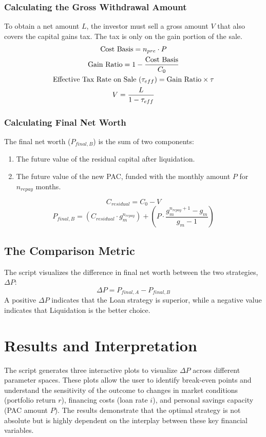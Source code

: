 \documentclass[a4paper, 11pt]{article}
\begin{document}
	\subsubsection{Calculating the Gross Withdrawal Amount}
	To obtain a net amount $L$, the investor must sell a gross amount $V$ that also covers the capital gains tax. The tax is only on the gain portion of the sale.
	\begin{gather}
		\text{Cost Basis} = n_{pre} \cdot P \\
		\text{Gain Ratio} = 1 - \frac{\text{Cost Basis}}{C_0} \\
		\text{Effective Tax Rate on Sale (\( \tau_{eff} \))} = \text{Gain Ratio} \times \tau \\
		V = \frac{L}{1 - \tau_{eff}}
	\end{gather}
	
	\subsubsection{Calculating Final Net Worth}
	The final net worth ($P_{final, B}$) is the sum of two components:
	\begin{enumerate}
		\item The future value of the residual capital after liquidation.
		\item The future value of the new PAC, funded with the monthly amount $P$ for $n_{repay}$ months.
	\end{enumerate}
	\begin{equation}
		C_{residual} = C_0 - V
	\end{equation}
	\begin{equation}
		P_{final, B} = (C_{residual} \cdot g_m^{n_{repay}}) + \left( P \cdot \frac{g_m^{n_{repay}+1} - g_m}{g_m - 1} \right)
	\end{equation}
	
	\subsection{The Comparison Metric}
	The script visualizes the difference in final net worth between the two strategies, $\Delta P$:
	\begin{equation}
		\Delta P = P_{final, A} - P_{final, B}
	\end{equation}
	A positive $\Delta P$ indicates that the Loan strategy is superior, while a negative value indicates that Liquidation is the better choice.
	
	\section{Results and Interpretation}
	The script generates three interactive plots to visualize $\Delta P$ across different parameter spaces. These plots allow the user to identify break-even points and understand the sensitivity of the outcome to changes in market conditions (portfolio return $r$), financing costs (loan rate $i$), and personal savings capacity (PAC amount $P$). The results demonstrate that the optimal strategy is not absolute but is highly dependent on the interplay between these key financial variables.
	
\end{document}
